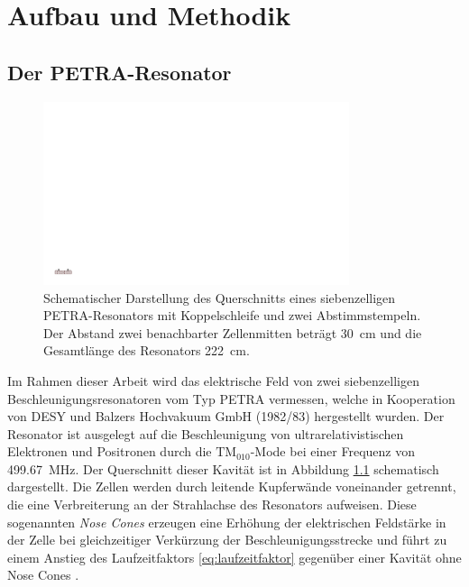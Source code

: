 \chapter{Aufbau und Methodik}
\label{sec:aufbau_und_methodik}

\section{Der PETRA-Resonator}
\begin{figure}[htb]
  \centering
  \includegraphics[width=0.8\textwidth]{./figs/cavity/cavity.pdf}
  \caption[Schematische Darstellung des Querschnitts eines siebenzelligen PETRA-Resonators mit Koppelschleife und zwei Abstimmstempeln]{Schematischer Darstellung des Querschnitts eines siebenzelligen PETRA-Resonators mit Koppelschleife und zwei Abstimmstempeln. Der Abstand zwei benachbarter Zellenmitten beträgt \SI{30}{\centi\metre} und die Gesamtlänge des Resonators \SI{222}{\centi\metre}.}
  \label{fig:petra_cavity}
\end{figure}
Im Rahmen dieser Arbeit wird das elektrische Feld von zwei siebenzelligen Beschleunigungsresonatoren vom Typ PETRA \cite{desy_petra} vermessen, welche in Kooperation von DESY und Balzers Hochvakuum GmbH (1982/83) hergestellt wurden.
Der Resonator ist ausgelegt auf die Beschleunigung von ultrarelativistischen Elektronen und Positronen durch die $\mathrm{TM}_{010}$-Mode bei einer Frequenz von \SI{499.67}{MHz}.
Der Querschnitt dieser Kavität ist in Abbildung \ref{fig:petra_cavity} schematisch dargestellt.
Die Zellen werden durch leitende Kupferwände voneinander getrennt, die eine Verbreiterung an der Strahlachse des Resonators aufweisen.
Diese sogenannten \textit{Nose Cones} erzeugen eine Erhöhung der elektrischen Feldstärke in der Zelle bei gleichzeitiger Verkürzung der Beschleunigungsstrecke und führt zu einem Anstieg des Laufzeitfaktors \eqref{eq:laufzeitfaktor} gegenüber einer Kavität ohne Nose Cones \cite[S.\ 48]{wangler}.

